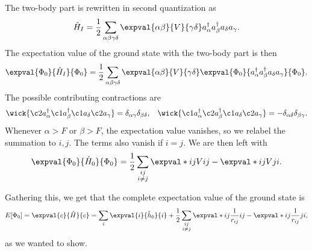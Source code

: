 The two-body part is rewritten in second quantization as
\begin{equation*}
    \hat{H}_I = \frac{1}{2} \sum_{\alpha \beta \gamma \delta} \expval{\alpha \beta}{V}{\gamma \delta} a_\alpha^\dagger a_\beta^\dagger a_\delta a_\gamma.
\end{equation*}
The expectation value of the ground state with the two-body part is then
\begin{equation*}
    \expval{\Phi_0}{\hat{H}_I}{\Phi_0} = \frac{1}{2} \sum_{\alpha\beta\gamma\delta} \expval{\alpha\beta}{V}{\gamma\delta} \expval{\Phi_0}{a_\alpha^\dagger a_\beta^\dagger a_\delta a_\gamma}{\Phi_0}.
\end{equation*}
The possible contributing contractions are
\begin{align*}
    \wick{\c2 a_\alpha^\dagger \c1 a_\beta^\dagger \c1 a_\delta \c2 a_\gamma} &= \delta_{\alpha\gamma} \delta_{\beta\delta}, &
    \wick{\c1 a_\alpha^\dagger \c2 a_\beta^\dagger \c1 a_\delta \c2 a_\gamma} &= -\delta_{\alpha\delta} \delta_{\beta\gamma}. \\
\end{align*}
Whenever $\alpha > F$ or $\beta > F$, the expectation value vanishes, so we relabel the summation to $i, j$. The terms also vanish if $i = j$. %
We are then left with
\begin{equation*}
    \expval{\Phi_0}{\hat{H}_0}{\Phi_0} = \frac{1}{2} \sum_{\substack{ij \\ i \neq j}} \expval*{ij}{V}{ij} - \expval*{ij}{V}{ji}.
\end{equation*}

Gathering this, we get that the complete expectation value of the ground state is
\begin{equation}
    E[\Phi_0]
    = \expval{c}{\hat{H}}{c}
    = \sum_{i} \expval{i}{\hat{h}_0}{i} + \frac{1}{2} \sum_{\substack{ij \\ i \neq j}} \expval*{ij}{\frac{1}{r_{ij}}}{ij} - \expval*{ij}{\frac{1}{r_{ij}}}{ji},
\end{equation}
as we wanted to show.

